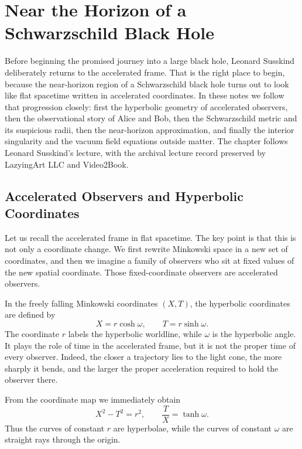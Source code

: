 \chapter{Near the Horizon of a Schwarzschild Black Hole}

Before beginning the promised journey into a large black hole, Leonard Susskind deliberately returns to the accelerated frame. That is the right place to begin, because the near-horizon region of a Schwarzschild black hole turns out to look like flat spacetime written in accelerated coordinates. In these notes we follow that progression closely: first the hyperbolic geometry of accelerated observers, then the observational story of Alice and Bob, then the Schwarzschild metric and its suspicious radii, then the near-horizon approximation, and finally the interior singularity and the vacuum field equations outside matter. The chapter follows Leonard Susskind's lecture, with the archival lecture record preserved by LazyingArt LLC and Video2Book.

\section{Accelerated Observers and Hyperbolic Coordinates}

Let us recall the accelerated frame in flat spacetime. The key point is that this is not only a coordinate change. We first rewrite Minkowski space in a new set of coordinates, and then we imagine a family of observers who sit at fixed values of the new spatial coordinate. Those fixed-coordinate observers are accelerated observers.

In the freely falling Minkowski coordinates \((X,T)\), the hyperbolic coordinates are defined by
\begin{equation}
X = r\cosh\omega,
\qquad
T = r\sinh\omega.
\end{equation}
The coordinate \(r\) labels the hyperbolic worldline, while \(\omega\) is the hyperbolic angle. It plays the role of time in the accelerated frame, but it is not the proper time of every observer. Indeed, the closer a trajectory lies to the light cone, the more sharply it bends, and the larger the proper acceleration required to hold the observer there.

From the coordinate map we immediately obtain
\begin{equation}
X^2 - T^2 = r^2,
\qquad
\frac{T}{X} = \tanh\omega.
\end{equation}
Thus the curves of constant \(r\) are hyperbolae, while the curves of constant \(\omega\) are straight rays through the origin.

